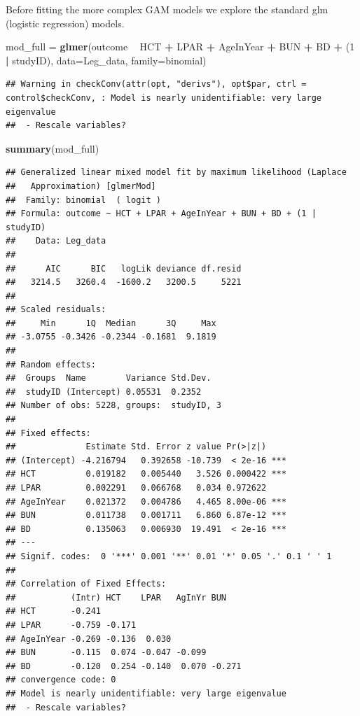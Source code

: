 \documentclass[]{article}
\newenvironment{Shaded}{\begin{snugshade}}{\end{snugshade}}
\newcommand{\KeywordTok}[1]{\textcolor[rgb]{0.13,0.29,0.53}{\textbf{#1}}}
\newcommand{\DataTypeTok}[1]{\textcolor[rgb]{0.13,0.29,0.53}{#1}}
\newcommand{\DecValTok}[1]{\textcolor[rgb]{0.00,0.00,0.81}{#1}}
\newcommand{\StringTok}[1]{\textcolor[rgb]{0.31,0.60,0.02}{#1}}
\newcommand{\OperatorTok}[1]{\textcolor[rgb]{0.81,0.36,0.00}{\textbf{#1}}}
\newcommand{\NormalTok}[1]{#1}
\begin{document}
Before fitting the more complex GAM models we explore the standard glm
(logistic regression) models.

\begin{Shaded}
\begin{Highlighting}[]
\NormalTok{mod_full =}\StringTok{ }\KeywordTok{glmer}\NormalTok{(outcome }\OperatorTok{~}\StringTok{ }\NormalTok{HCT }\OperatorTok{+}\StringTok{ }\NormalTok{LPAR }\OperatorTok{+}\StringTok{ }\NormalTok{AgeInYear }\OperatorTok{+}\StringTok{ }\NormalTok{BUN }\OperatorTok{+}\StringTok{ }\NormalTok{BD }\OperatorTok{+}\StringTok{ }\NormalTok{(}\DecValTok{1} \OperatorTok{|}\StringTok{ }\NormalTok{studyID),}
               \DataTypeTok{data=}\NormalTok{Leg_data, }\DataTypeTok{family=}\NormalTok{binomial)}
\end{Highlighting}
\end{Shaded}

\begin{verbatim}
## Warning in checkConv(attr(opt, "derivs"), opt$par, ctrl = control$checkConv, : Model is nearly unidentifiable: very large eigenvalue
##  - Rescale variables?
\end{verbatim}

\begin{Shaded}
\begin{Highlighting}[]
\KeywordTok{summary}\NormalTok{(mod_full)}
\end{Highlighting}
\end{Shaded}

\begin{verbatim}
## Generalized linear mixed model fit by maximum likelihood (Laplace
##   Approximation) [glmerMod]
##  Family: binomial  ( logit )
## Formula: outcome ~ HCT + LPAR + AgeInYear + BUN + BD + (1 | studyID)
##    Data: Leg_data
## 
##      AIC      BIC   logLik deviance df.resid 
##   3214.5   3260.4  -1600.2   3200.5     5221 
## 
## Scaled residuals: 
##     Min      1Q  Median      3Q     Max 
## -3.0755 -0.3426 -0.2344 -0.1681  9.1819 
## 
## Random effects:
##  Groups  Name        Variance Std.Dev.
##  studyID (Intercept) 0.05531  0.2352  
## Number of obs: 5228, groups:  studyID, 3
## 
## Fixed effects:
##              Estimate Std. Error z value Pr(>|z|)    
## (Intercept) -4.216794   0.392658 -10.739  < 2e-16 ***
## HCT          0.019182   0.005440   3.526 0.000422 ***
## LPAR         0.002291   0.066768   0.034 0.972622    
## AgeInYear    0.021372   0.004786   4.465 8.00e-06 ***
## BUN          0.011738   0.001711   6.860 6.87e-12 ***
## BD           0.135063   0.006930  19.491  < 2e-16 ***
## ---
## Signif. codes:  0 '***' 0.001 '**' 0.01 '*' 0.05 '.' 0.1 ' ' 1
## 
## Correlation of Fixed Effects:
##           (Intr) HCT    LPAR   AgInYr BUN   
## HCT       -0.241                            
## LPAR      -0.759 -0.171                     
## AgeInYear -0.269 -0.136  0.030              
## BUN       -0.115  0.074 -0.047 -0.099       
## BD        -0.120  0.254 -0.140  0.070 -0.271
## convergence code: 0
## Model is nearly unidentifiable: very large eigenvalue
##  - Rescale variables?
\end{verbatim}
\end{document}
